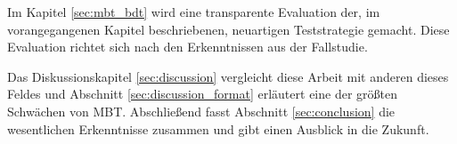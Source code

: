 Im Kapitel \ref{sec:mbt_bdt} wird eine transparente Evaluation der, im vorangegangenen Kapitel beschriebenen, neuartigen Teststrategie gemacht. Diese Evaluation richtet sich nach den Erkenntnissen aus der Fallstudie.    

Das Diskussionskapitel \ref{sec:discussion} vergleicht diese Arbeit mit anderen dieses Feldes und Abschnitt \ref{sec:discussion_format} erläutert eine der größten Schwächen von \Gls{MBT}. Abschließend fasst Abschnitt \ref{sec:conclusion} die wesentlichen Erkenntnisse zusammen und gibt einen Ausblick in die Zukunft.
